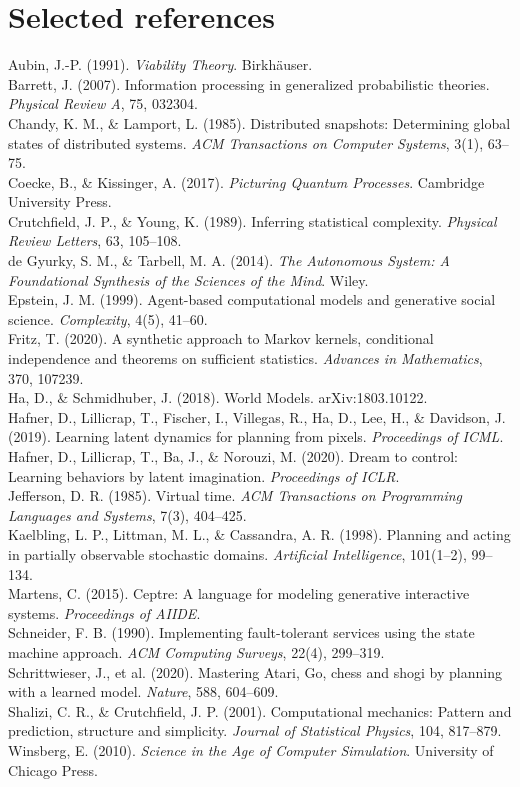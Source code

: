 \documentclass[11pt]{article}
\begin{document}
\section*{Selected references}
\begin{small}
\noindent Aubin, J.-P. (1991). \emph{Viability Theory}. Birkh\"auser.\\
Barrett, J. (2007). Information processing in generalized probabilistic theories. \emph{Physical Review A}, 75, 032304.\\
Chandy, K. M., \& Lamport, L. (1985). Distributed snapshots: Determining global states of distributed systems. \emph{ACM Transactions on Computer Systems}, 3(1), 63--75.\\
Coecke, B., \& Kissinger, A. (2017). \emph{Picturing Quantum Processes}. Cambridge University Press.\\
Crutchfield, J. P., \& Young, K. (1989). Inferring statistical complexity. \emph{Physical Review Letters}, 63, 105--108.\\
de Gyurky, S. M., \& Tarbell, M. A. (2014). \emph{The Autonomous System: A Foundational Synthesis of the Sciences of the Mind}. Wiley.\\
Epstein, J. M. (1999). Agent-based computational models and generative social science. \emph{Complexity}, 4(5), 41--60.\\
Fritz, T. (2020). A synthetic approach to Markov kernels, conditional independence and theorems on sufficient statistics. \emph{Advances in Mathematics}, 370, 107239.\\
Ha, D., \& Schmidhuber, J. (2018). World Models. arXiv:1803.10122.\\
Hafner, D., Lillicrap, T., Fischer, I., Villegas, R., Ha, D., Lee, H., \& Davidson, J. (2019). Learning latent dynamics for planning from pixels. \emph{Proceedings of ICML}.\\
Hafner, D., Lillicrap, T., Ba, J., \& Norouzi, M. (2020). Dream to control: Learning behaviors by latent imagination. \emph{Proceedings of ICLR}.\\
Jefferson, D. R. (1985). Virtual time. \emph{ACM Transactions on Programming Languages and Systems}, 7(3), 404--425.\\
Kaelbling, L. P., Littman, M. L., \& Cassandra, A. R. (1998). Planning and acting in partially observable stochastic domains. \emph{Artificial Intelligence}, 101(1--2), 99--134.\\
Martens, C. (2015). Ceptre: A language for modeling generative interactive systems. \emph{Proceedings of AIIDE}.\\
Schneider, F. B. (1990). Implementing fault-tolerant services using the state machine approach. \emph{ACM Computing Surveys}, 22(4), 299--319.\\
Schrittwieser, J., et al. (2020). Mastering Atari, Go, chess and shogi by planning with a learned model. \emph{Nature}, 588, 604--609.\\
Shalizi, C. R., \& Crutchfield, J. P. (2001). Computational mechanics: Pattern and prediction, structure and simplicity. \emph{Journal of Statistical Physics}, 104, 817--879.\\
Winsberg, E. (2010). \emph{Science in the Age of Computer Simulation}. University of Chicago Press.
\end{small}
\end{document}
